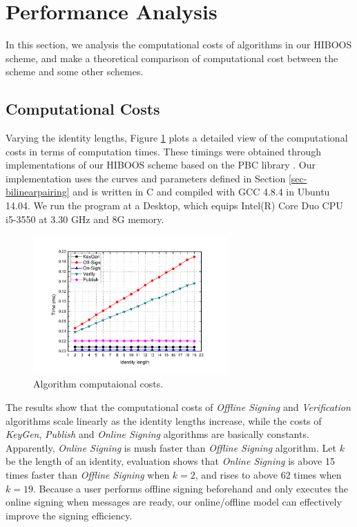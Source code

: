 \documentclass[times]{secauth}
\theoremstyle{definition}
\theoremstyle{remark}
\begin{document}
\section{Performance Analysis}\label{sec-Performance}
In this section, we analysis the computational costs of algorithms in our HIBOOS scheme, and make a theoretical comparison of computational cost between the scheme and some other schemes.

\subsection{Computational Costs}
Varying the identity lengths, Figure \ref{fig-cost} plots a detailed view of the computational costs in terms of computation times.  
These timings were obtained through implementations of our HIBOOS scheme based on the PBC library \cite{pbclib}.
Our implementation uses the curves and parameters defined in Section \ref{sec-bilinearpairing} and is written in C and compiled with GCC 4.8.4 in Ubuntu 14.04. 
We run the program at a Desktop, which equips Intel(R) Core Duo CPU i5-3550 at 3.30 GHz and 8G memory. 
 
\begin{figure}
\centering
\includegraphics[width=7.5cm]{computationcost.pdf}
\caption{Algorithm computaional costs. } \label{fig-cost}
\end{figure}

The results show that the computational costs of \emph{Offline Signing} and \emph{Verification} algorithms scale linearly as the identity lengths increase, while the costs of \emph{KeyGen}, \emph{Publish} and \emph{Online Signing} algorithms are basically constants. 
Apparently, \emph{Online Signing} is mush faster than \textit{Offline Signing} algorithm.
Let $k$ be the length of an identity, evaluation shows that \emph{Online Signing} is above 15 times faster than \textit{Offline Signing} when $k = 2$, and rises to above 62 times when $k = 19$.
Because a user performs offline signing beforehand and only executes the online signing when messages are ready, our online/offline model can effectively improve the signing efficiency.
\end{document}
